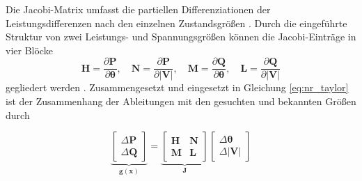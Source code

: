 Die Jacobi-Matrix umfasst die partiellen Differenziationen der Leistungsdifferenzen nach den einzelnen Zustandsgrößen .
Durch die eingeführte Struktur von zwei Leistungs- und Spannungsgrößen können die Jacobi-Einträge in vier Blöcke 
\begin{equation}
	\mathbf{H} = \frac{\partial \mathbf{P}}{\partial \boldsymbol{\theta}}, \quad
	\mathbf{N} = \frac{\partial \mathbf{P}}{\partial |\mathbf{V}|}, \quad
	\mathbf{M} = \frac{\partial \mathbf{Q}}{\partial \boldsymbol{\theta}}, \quad
	\mathbf{L} = \frac{\partial \mathbf{Q}}{\partial |\mathbf{V}|}
\end{equation}
gegliedert werden . 
Zusammengesetzt und eingesetzt in Gleichung \eqref{eq:nr_taylor} ist der Zusammenhang der Ableitungen mit den gesuchten und bekannten Größen durch 



\begin{equation}
	\label{eq:nr_linearization}
	\underbrace{
	\begin{bmatrix} \Delta \mathbf{P} \\ \Delta \mathbf{Q} \end{bmatrix}
	}_{\mathbf{g}(\mathbf{x})}
	=
	\underbrace{
		\begin{bmatrix}
			\mathbf{H} & \mathbf{N} \\
			\mathbf{M} & \mathbf{L}
		\end{bmatrix}
	}_{\mathbf{J}}
	\begin{bmatrix} \Delta \boldsymbol{\theta} \\ \Delta |\mathbf{V}|\end{bmatrix}
\end{equation}

